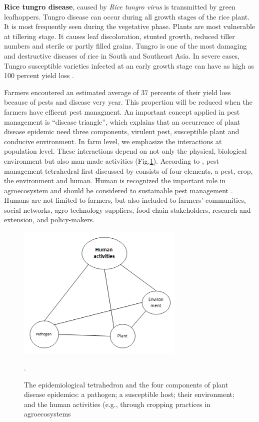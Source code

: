 \documentclass[12pt, oneside]{report}
\begin{document}
\textbf{Rice tungro disease}, caused by \textit{Rice tungro virus} is transmitted by green leafhoppers. Tungro disease can occur during all growth stages of the rice plant. It is most frequently seen during the vegetative phase. Plants are most vulnerable at tillering stage. It causes leaf discoloration, stunted growth, reduced tiller numbers and sterile or partly filled grains. Tungro is one of the most damaging and destructive diseases of rice in South and Southeast Asia. In severe cases, Tungro susceptible varieties infected at an early growth stage can have as high as 100 percent yield loss \cite{irrirkb}.

Farmers encoutered an estimated average of 37 percents of their yield loss because of pests and disease very year. This propertion will be reduced when the farmers have efficent pest managment. An important concept applied in pest management is ``disease triangle'', which explains that an occurrence of plant disease epidemic need three components, virulent pest, susceptible plant and conducive environment. In farm level, we emphasize the interactions at population level. These interactions depend on not only the physical, biological environment but also man-made activities (Fig.\ref{fig:diseasetriangle}). According to \citet{Savary:2006to}, pest management tetrahedral first discussed by \cite{Zadoks:1979ts} consists of four elements, a pest, crop, the environment and human. Human is recognized the important role in agroecosystem and should be considered to sustainable pest management \citep{Zadok1985}. Humans are not limited to farmers, but also included to farmers' communities, social networks, agro-technology suppliers, food-chain stakeholders, research and extension, and policy-makers.

\begin{figure}
\includegraphics[width=8cm]{distriangle}
\centering
\caption{The epidemiological tetrahedron and the four components of plant disease epidemics: a pathogen; a susceptible host; their environment; and the human activities (e.g., through cropping practices in agroecosystems}.
\label{fig:diseasetriangle}
\end{figure}
\end{document}
